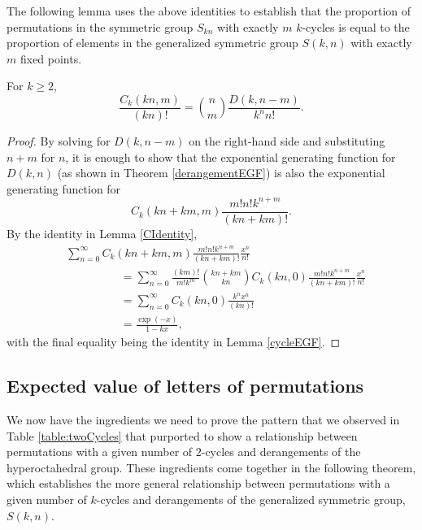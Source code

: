 The following lemma uses the above identities to establish that
the proportion of permutations in the symmetric group $S_{kn}$
with exactly $m$ $k$-cycles is equal to
the proportion of elements in the generalized symmetric group $S(k,n)$
with exactly $m$ fixed points.
\begin{lemma}
  \label{lem:fixedPointsAndCycles}
  For $k \geq 2$,
 \begin{equation}
    \frac{C_k(kn, m)}{(kn)!} = \binom nm\frac{D(k, n - m)}{k^nn!}.
    \label{eq:fixedPointsAndCycles}
  \end{equation}
\end{lemma}
\begin{proof}
  By solving for $D(k,n-m)$ on the right-hand side and substituting $n + m$ for $n$, it is
  enough to show that the exponential generating function for $D(k,n)$
  (as shown in Theorem \ref{derangementEGF}) is also
  the exponential generating function for \begin{equation}
    C_k(kn+km, m) \frac{m!n!k^{n+m}}{(kn + km)!}.
  \end{equation}
  By the identity in Lemma \ref{CIdentity},
  \begin{align}
    &\sum_{n=0}^\infty C_k(kn+km, m) \frac{m!n!k^{n+m}}{(kn + km)!}\frac{x^n}{n!} \\
    &\hspace{2cm} = \sum_{n=0}^\infty \frac{(km)!}{m!k^m}\binom{kn + km}{kn}C_k(kn, 0) \frac{m!n!k^{n+m}}{(kn + km)!}\frac{x^n}{n!} \\
    &\hspace{2cm} = \sum_{n=0}^\infty C_k(kn, 0)\frac{k^nx^n}{(kn)!} \\
    &\hspace{2cm} = \frac{\exp(-x)}{1-kx},
  \end{align}
  with the final equality being the identity in Lemma \ref{cycleEGF}.
\end{proof}

\subsection{Expected value of letters of permutations}
We now have the ingredients we need to prove the pattern that we observed in
Table \ref{table:twoCycles} that purported to show a relationship between
permutations with a given number of $2$-cycles and derangements of the
hyperoctahedral group.
These ingredients come together in the following theorem, which
establishes the more general relationship between permutations with a given
number of $k$-cycles and derangements of the generalized symmetric
group, $S(k,n)$.

